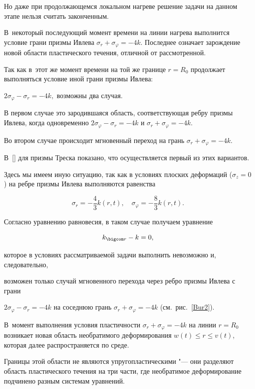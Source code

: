 Но даже при продолжающемся локальном нагреве решение задачи на данном этапе нельзя считать законченным.  

В~некоторый последующий момент времени на линии нагрева выполнится условие грани призмы Ивлева $\sigma _{r} +\sigma _{\varphi } =-4k$. Последнее означает зарождение новой области пластического течения, отличной от рассмотренной. 

Так как в~этот же момент времени на той же границе $r=R_{0} $ продолжает выполняться условие иной грани призмы Ивлева: 

$2\sigma _{\varphi } -\sigma _{r} =-4k,$ возможны два случая. 

В первом случае это зародившаяся область, соответствующая ребру призмы Ивлева, когда одновременно $2\sigma _{\varphi } -\sigma _{r} =-4k$ и $\sigma _{r} +\sigma _{\varphi } =-4k$.

Во втором случае происходит мгновенный переход на грань $\sigma _{r} +\sigma _{\varphi } =-4k$.  

В~[] для призмы Треска показано, что осуществляется первый из этих вариантов. 

Здесь мы имеем иную ситуацию, так как в условиях плоских деформаций ($\sigma _{z} =0$) на ребре призмы Ивлева выполняются равенства 

$$

\sigma _{r} =-\frac{4}{3} k (r,t), \quad \sigma _{\varphi } =-\frac{8}{3} k(r,t).

$$  

Согласно уравнению равновесия, в таком случае получаем уравнение 

$$

k_{\bigcom r} -k=0,

$$ 

которое в условиях рассматриваемой задачи выполнить невозможно и, следовательно, 

возможен только случай мгновенного перехода через ребро призмы Ивлева с грани 

$2\sigma _{\varphi } -\sigma _{r} =-4k$ на соседнюю грань $\sigma _{r} +\sigma _{\varphi } =-4k$ (см.~рис.~\ref{Bur2}). 



В~момент выполнения условия пластичности $\sigma _{r} +\sigma _{\varphi } =-4k$ на линии ${r\!=\!R_0} $  возникает новая область необратимого деформирования ${w(t)\!\le\! r \!\le\! v(t)}$, которая далее распространяется по среде.   

Границы этой области не являются упругопластическими "--- они разделяют область пластического течения на три части, где необратимое деформирование подчинено разным системам уравнений. 

